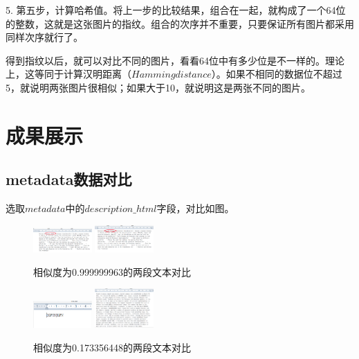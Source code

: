 \documentclass[UTF8,a4paper,10pt, twocolumn]{ctexart}
\begin{document}
5. 第五步，计算哈希值。将上一步的比较结果，组合在一起，就构成了一个64位的整数，这就是这张图片的指纹。组合的次序并不重要，只要保证所有图片都采用同样次序就行了。

得到指纹以后，就可以对比不同的图片，看看64位中有多少位是不一样的。理论上，这等同于计算汉明距离（$Hamming distance$）。如果不相同的数据位不超过5，就说明两张图片很相似；如果大于10，就说明这是两张不同的图片。

\section{成果展示}
\subsection{metadata数据对比}
选取$metadata$中的$description\_html$字段，对比如图。

\begin{figure}[htbp]
\centering
\includegraphics[width=0.2\textwidth]{img/fig1.png}
\includegraphics[width=0.2\textwidth]{img/fig2.png}
\caption{相似度为0.999999963的两段文本对比}
\label{figure:zju1}
\end{figure}

\begin{figure}[htbp]
  \centering
  \includegraphics[width=0.2\textwidth]{img/fig3.png}
  \includegraphics[width=0.2\textwidth]{img/fig4.png}
  \caption{相似度为0.173356448的两段文本对比}
  \label{figure:zju2}
  \end{figure}
\end{document}

